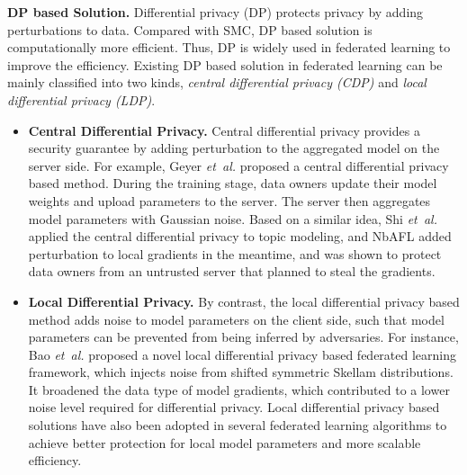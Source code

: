 \documentclass[11pt]{article}
\newcommand{\etal}{\textit{et~al.}\xspace}
\newcommand{\fakeparagraph}[1]{\vspace{1mm}\noindent\textbf{#1.}}
\begin{document}
\fakeparagraph{DP based Solution}
Differential privacy (DP) protects privacy by adding perturbations to data. Compared with SMC, DP based solution is computationally more efficient. Thus, DP is widely used in federated learning to improve the efficiency.
Existing DP based solution in federated learning can be mainly classified into two kinds, \textit{central differential privacy (CDP)} and \textit{local differential privacy (LDP)}.

\begin{itemize}
    \item \textbf{Central Differential Privacy.}
    Central differential privacy provides a security guarantee by adding perturbation to the aggregated model on the server side. For example, Geyer \etal \cite{Yongxin-DBLP:journals/corr/abs-1712-07557} proposed a central differential privacy based method.
    During the training stage, data owners update their model weights and upload parameters to the server.
    The server then aggregates model parameters with Gaussian noise.
    Based on a similar idea, Shi \etal~\cite{Yongxin-is20shi} applied the central differential privacy to topic modeling, and \textsf{NbAFL} \cite{Yongxin-DBLP:journals/tifs/WeiLDMYFJQP20} added perturbation to local gradients in the meantime, and was shown to protect data owners from an untrusted server that planned to steal the gradients.
	
    \item \textbf{Local Differential Privacy.}
    By contrast, the local differential privacy based method adds noise to model parameters on the client side, such that model parameters can be prevented from being inferred by adversaries.
    For instance, Bao \etal \cite{Yongxin-DBLP:journals/pvldb/BaoZXYOTA22} proposed a novel local differential privacy based federated learning framework, which injects noise from shifted symmetric Skellam distributions.
	It broadened the data type of model gradients, which contributed to a lower noise level required for differential privacy.
    Local differential privacy based solutions have also been adopted in several federated learning algorithms \cite{Yongxin-DBLP:journals/tifs/WeiLDMYFJQP20, Yongxin-DBLP:conf/dasfaa/LiuCYC20, Yongxin-DBLP:conf/isit/SeifTL20, Yongxin-wangaaai20} to achieve better protection for local model parameters and more scalable efficiency.
\end{itemize}
\end{document}
